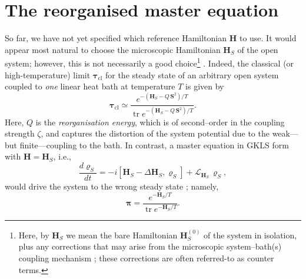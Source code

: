 \documentclass[aps,pra,superscriptaddress,twocolumn,nofootinbib]{revtex4-2}
\DeclareMathOperator{\tr}{tr}
\begin{document}
\section{The reorganised master equation}\label{sec:reorganised-master-equation}

So far, we have not yet specified which reference Hamiltonian $ \pmb{H} $ to use. It would appear most natural to choose the microscopic Hamiltonian $\pmb{H}_S$ of the open system; however, this is not necessarily a good choice\footnote{Here, by $\pmb{H}_S$ we mean the bare Hamiltonian $ \pmb{H}_S^{(0)} $ of the system in isolation, plus any corrections that may arise from the microscopic system--bath(s) coupling mechanism \cite{caldeira1983tunnelling,correa2023}; these corrections are often referred-to as counter terms.} \cite{winczewski2021,lobejko202,correa2023}. Indeed, the classical (or high-temperature) limit $ \pmb{\tau}_\text{cl} $ for the steady state of an arbitrary open system coupled to \textit{one} linear heat bath at temperature $T$ is given by \cite{cerisola2022,cresser2021,timofeev2022,correa2023}
\begin{equation}\label{eq:general-high-T-mean-force}
	\pmb{\tau}_\text{cl} \simeq \frac{e^{-(\pmb{H}_S - Q\,\pmb{S}^2)/T}}{\tr{e^{-(\pmb{H}_S - Q\,\pmb{S}^2)/T}}}.
\end{equation}
Here, $ Q $ is the \textit{reorganisation energy}, which is of second--order in the coupling strength $\zeta$, and captures the distortion of the system potential due to the weak---but finite---coupling to the bath. In contrast, a master equation in GKLS form with $ \pmb{H} = \pmb{H}_S $, i.e.,
\begin{equation}\label{eq:conventional}
    \frac{d\pmb{\varrho}_S}{dt} = -i[\pmb{H}_S-\Delta\pmb{H}_S,\pmb{\varrho}_S] + \mathcal{L}_{\pmb{H}_S}\,\pmb{\varrho}_S,
\end{equation}
would drive the system to the wrong steady state \cite{spohn1978}; namely, 
\begin{equation*}
	\pmb{\pi} = \frac{e^{-\pmb{H}_S/T}}{\tr{e^{-\pmb{H}_S/T}}}.
\end{equation*}
\end{document}
